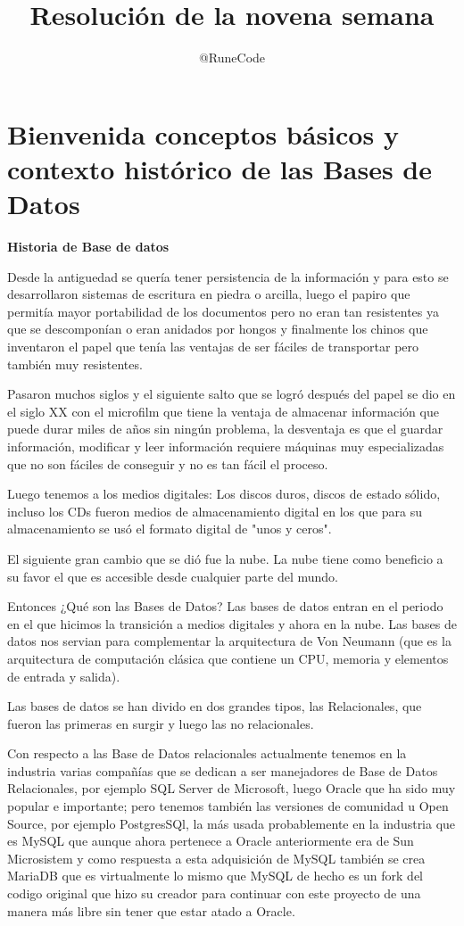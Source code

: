 \documentclass{article}
\title{Resolución de la novena semana}
\author{@RuneCode}
\begin{document}


\section{Bienvenida conceptos básicos y contexto histórico de las Bases de Datos}%

\textbf{Historia de Base de datos}

Desde la antiguedad se quería tener persistencia de la información y para esto
se desarrollaron sistemas de escritura en piedra o arcilla, luego el papiro que
permitía mayor portabilidad de los documentos pero no eran tan resistentes ya
que se descomponían o eran anidados por hongos y finalmente los chinos que
inventaron el papel que tenía las ventajas de ser fáciles de transportar pero
también muy resistentes.

Pasaron muchos siglos y el siguiente salto que se logró después del papel se
dio en el siglo XX con el microfilm que tiene la ventaja de almacenar
información que puede durar miles de años sin ningún problema, la desventaja es
que el guardar información, modificar y leer información requiere máquinas muy
especializadas que no son fáciles de conseguir y no es tan fácil el proceso.

Luego tenemos a los medios digitales: Los discos duros, discos de estado
sólido, incluso los CDs fueron medios de almacenamiento digital en los que para
su almacenamiento se usó el formato digital de "unos y ceros".

El siguiente gran cambio que se dió fue la nube. La nube tiene como beneficio a
su favor el que es accesible desde cualquier parte del mundo.

Entonces ¿Qué son las Bases de Datos?
Las bases de datos entran en el periodo en el que hicimos la transición a
medios digitales y ahora en la nube.
Las bases de datos nos servian para complementar la arquitectura de Von Neumann
(que es la arquitectura de computación clásica que contiene un CPU, memoria y
elementos de entrada y salida).

Las bases de datos se han divido en dos grandes tipos, las Relacionales, que
fueron las primeras en surgir y luego las no relacionales.

Con respecto a las Base de Datos relacionales actualmente tenemos en la
industria varias compañías que se dedican a ser manejadores de Base de Datos
Relacionales, por ejemplo SQL Server de Microsoft, luego Oracle que ha sido muy
popular e importante; pero tenemos también las versiones de comunidad u Open
Source, por ejemplo PostgresSQl, la más usada probablemente en la industria que
es MySQL que aunque ahora pertenece a Oracle anteriormente era de Sun
Microsistem y como respuesta a esta adquisición de MySQL también se crea
MariaDB que es virtualmente lo mismo que MySQL de hecho es un fork del codigo
original que hizo su creador para continuar con este proyecto de una manera más
libre sin tener que estar atado a Oracle.
\end{document}

